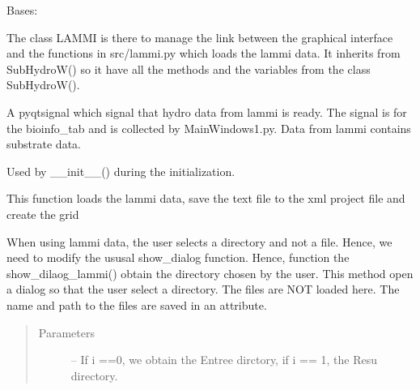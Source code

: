 \documentclass[letterpaper,10pt,english]{sphinxmanual}
\begin{document}
\begin{fulllineitems}
\label{\detokenize{index:src_GUI.hydro_GUI_2.LAMMI}}
Bases: {\hyperref[\detokenize{index:src_GUI.hydro_GUI_2.SubHydroW}]{}}

The class LAMMI is there to manage the link between the graphical interface and the functions in src/lammi.py
which loads the lammi data. It inherits from SubHydroW() so it have all the methods and the variables
from the class SubHydroW().

\begin{fulllineitems}
\label{\detokenize{index:src_GUI.hydro_GUI_2.LAMMI.drop_merge}}
A pyqtsignal which signal that hydro data from lammi is ready. The signal is for the bioinfo\_tab and is collected
by MainWindows1.py. Data from lammi contains substrate data.

\end{fulllineitems}


\begin{fulllineitems}
\label{\detokenize{index:src_GUI.hydro_GUI_2.LAMMI.init_iu}}
Used by \_\_init\_\_() during the initialization.

\end{fulllineitems}


\begin{fulllineitems}
\label{\detokenize{index:src_GUI.hydro_GUI_2.LAMMI.load_lammi_gui}}
This function loads the lammi data, save the text file to the xml project file and create the grid

\end{fulllineitems}


\begin{fulllineitems}
\label{\detokenize{index:src_GUI.hydro_GUI_2.LAMMI.show_dialog_lammi}}
When using lammi data, the user selects a directory and not a file. Hence, we need to modify the ususal
show\_dialog function. Hence, function the show\_dilaog\_lammi() obtain the directory chosen by the user.
This method open a dialog so that the user select a directory. The files are NOT loaded here. The name and path
to the files are saved in an attribute.
\begin{quote}\begin{description}
\item[{Parameters}] \leavevmode
{} -- If i ==0, we obtain the Entree dirctory, if i == 1, the Resu directory.


\end{description}
\end{quote}
\end{fulllineitems}
\end{fulllineitems}
\end{document}
